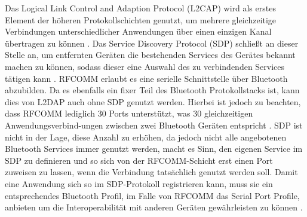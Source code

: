 	Das Logical Link Control and Adaption Protocol (L2CAP) wird als erstes Element der höheren Protokollschichten genutzt, um mehrere gleichzeitige Verbindungen unterschiedlicher Anwendungen über einen einzigen Kanal übertragen zu können \cite[S.395]{Sauter}. Das Service Discovery Protocol (SDP) schließt an dieser Stelle an, um entfernten Geräten die bestehenden Services des Gerätes bekannt machen zu können, sodass dieser eine Auswahl des zu verbindenden Services tätigen kann \cite[S.395]{morrow}. RFCOMM erlaubt es eine serielle Schnittstelle über Bluetooth abzubilden. Da es ebenfalls ein fixer Teil des Bluetooth Protokollstacks ist, kann dies von L2DAP auch ohne SDP genutzt werden. Hierbei ist jedoch zu beachten, dass RFCOMM lediglich 30 Ports unterstützt, was 30 gleichzeitigen Anwendungsverbind-ungen zwischen zwei Bluetooth Geräten entspricht \cite[S.398]{Sauter}. SDP ist nicht in der Lage, diese Anzahl zu erhöhen, da jedoch nicht alle angebotenen Bluetooth Services immer genutzt werden, macht es Sinn, den eigenen Service im SDP zu definieren und so sich von der RFCOMM-Schicht erst einen Port zuweisen zu lassen, wenn die Verbindung tatsächlich genutzt werden soll. Damit eine Anwendung sich so im SDP-Protokoll registrieren kann, muss sie ein entsprechendes Bluetooth Profil, im Falle von RFCOMM das Serial Port Profile, anbieten um die Interoperabilität mit anderen Geräten gewährleisten zu können \cite[S.411]{Sauter}.
	
